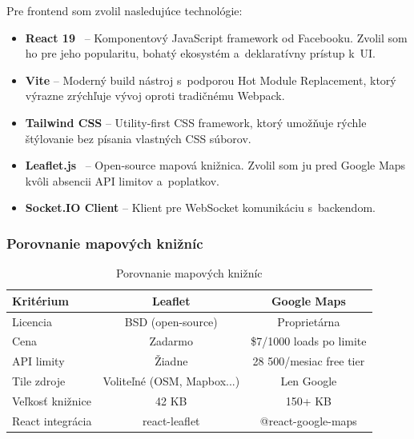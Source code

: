 Pre frontend som zvolil nasledujúce technológie:

\begin{itemize}
    \item \textbf{React 19}~\cite{react_docs} -- Komponentový JavaScript framework od Facebooku. Zvolil som ho pre jeho popularitu, bohatý ekosystém a~deklaratívny prístup k~UI.

    \item \textbf{Vite} -- Moderný build nástroj s~podporou Hot Module Replacement, ktorý výrazne zrýchľuje vývoj oproti tradičnému Webpack.

    \item \textbf{Tailwind CSS} -- Utility-first CSS framework, ktorý umožňuje rýchle štýlovanie bez písania vlastných CSS súborov.

    \item \textbf{Leaflet.js}~\cite{leaflet_docs} -- Open-source mapová knižnica. Zvolil som ju pred Google Maps kvôli absencii API limitov a~poplatkov.

    \item \textbf{Socket.IO Client} -- Klient pre WebSocket komunikáciu s~backendom.
\end{itemize}

\subsubsection{Porovnanie mapových knižníc}

\begin{table}[htbp]
    \centering
    \begin{tabular}{|l|c|c|}
        \hline
        \textbf{Kritérium} & \textbf{Leaflet} & \textbf{Google Maps} \\
        \hline
        Licencia & BSD (open-source) & Proprietárna \\
        Cena & Zadarmo & \$7/1000 loads po limite \\
        API limity & Žiadne & 28 500/mesiac free tier \\
        Tile zdroje & Voliteľné (OSM, Mapbox...) & Len Google \\
        Veľkosť knižnice & 42 KB & 150+ KB \\
        React integrácia & react-leaflet & @react-google-maps \\
        \hline
    \end{tabular}
    \caption{Porovnanie mapových knižníc}
    \label{tab:maps-comparison}
\end{table}

